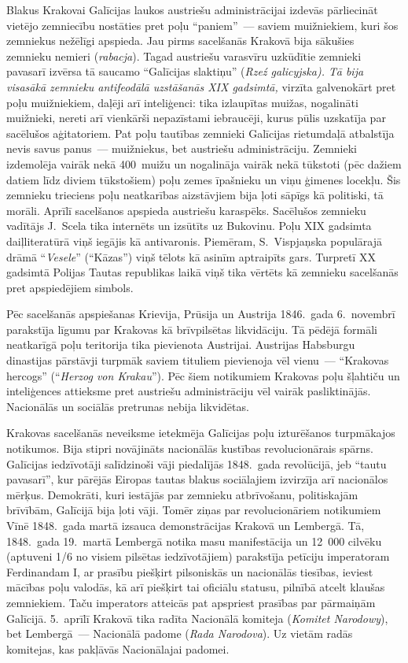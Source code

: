 \documentclass[twoside,a5paper,12pt,fleqn,openany]{extbook}
\newcommand{\pltxti}[1]{\textit{\textpolish{#1}}}
\newcommand{\detxti}[1]{\textit{\textgerman{#1}}}
\begin{document}
Blakus Krakovai Galīcijas laukos austriešu administrācijai izdevās pārliecināt vietējo zemniecību nostāties pret poļu ``paniem''~--- saviem muižniekiem, kuri šos zemniekus nežēlīgi apspieda. Jau pirms sacelšanās Krakovā bija sākušies zemnieku nemieri (\pltxti{rabacja}). Tagad austriešu varasvīru uzkūdītie zemnieki pavasarī izvērsa tā saucamo ``Galīcijas slaktiņu'' (\pltxti{Rzeź galicyjska). Tā bija visasākā zemnieku antifeodālā uzstāšanās XIX gadsimtā,} virzīta galvenokārt pret poļu muižniekiem, daļēji arī inteliģenci: tika izlaupītas muižas, nogalināti muižnieki, nereti arī vienkārši nepazīstami iebraucēji, kurus pūlis uzskatīja par sacēlušos aģitatoriem. Pat poļu tautības zemnieki Galīcijas rietumdaļā atbalstīja nevis savus panus~--- muižniekus, bet austriešu administrāciju. Zemnieki izdemolēja vairāk nekā 400~muižu un nogalināja vairāk nekā tūkstoti (pēc dažiem datiem līdz diviem tūkstošiem) poļu zemes īpašnieku un viņu ģimenes locekļu. Šis zemnieku trieciens poļu neatkarības aizstāvjiem bija ļoti sāpīgs kā politiski, tā morāli. Aprīlī sacelšanos apspieda austriešu karaspēks. Sacēlušos zemnieku vadītājs J.~Scela tika internēts un izsūtīts uz Bukovinu. Poļu XIX gadsimta daiļliteratūrā viņš iegājis kā antivaronis. Piemēram, S.~Vispjaņska populārajā drāmā ``\pltxti{Vesele}'' (``Kāzas'') viņš tēlots kā asinīm aptraipīts gars. Turpretī XX gadsimtā Polijas Tautas republikas laikā viņš tika vērtēts kā zemnieku sacelšanās pret apspiedējiem simbols.

Pēc sacelšanās apspiešanas Krievija, Prūsija un Austrija 1846.~gada 6.~novembrī parakstīja līgumu par Krakovas kā brīvpilsētas likvidāciju. Tā pēdējā formāli neatkarīgā poļu teritorija tika pievienota Austrijai. Austrijas Habsburgu dinastijas pārstāvji turpmāk saviem tituliem pievienoja vēl vienu~--- ``Krakovas hercogs'' (``\detxti{Herzog von Krakau}''). Pēc šiem notikumiem Krakovas poļu šļahtiču un inteliģences attieksme pret austriešu administrāciju vēl vairāk pasliktinājās. Nacionālās un sociālās pretrunas nebija likvidētas.

Krakovas sacelšanās neveiksme ietekmēja Galīcijas poļu izturēšanos turpmākajos notikumos. Bija stipri novājināts nacionālās kustības revolucionārais spārns. Galīcijas iedzīvotāji salīdzinoši vāji piedalījās 1848.~gada revolūcijā, jeb ``tautu pavasarī'', kur pārējās Eiropas tautas blakus sociālajiem izvirzīja arī nacionālos mērķus. Demokrāti, kuri iestājās par zemnieku atbrīvošanu, politiskajām brīvībām, Galīcijā bija ļoti vāji. Tomēr ziņas par revolucionāriem notikumiem Vīnē 1848.~gada martā izsauca demonstrācijas Krakovā un Lembergā. Tā, 1848.~gada 19.~martā Lembergā notika masu manifestācija un 12~000 cilvēku (aptuveni 1/6 no visiem pilsētas iedzīvotājiem) parakstīja petīciju imperatoram Ferdinandam I, ar prasību piešķirt pilsoniskās un nacionālās tiesības, ieviest mācības poļu valodās, kā arī piešķirt tai oficiālu statusu, pilnībā atcelt klaušas zemniekiem. Taču imperators atteicās pat apspriest prasības par pārmaiņām Galīcijā. 5.~aprīlī Krakovā tika radīta Nacionālā komiteja (\pltxti{Komitet Narodowy}), bet Lembergā~--- Nacionālā padome (\pltxti{Rada Narodova}). Uz vietām radās komitejas, kas pakļāvās Nacionālajai padomei.
\end{document}
